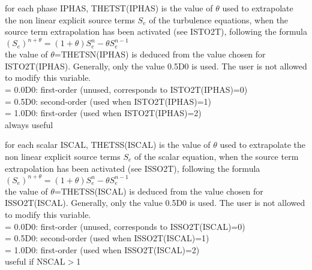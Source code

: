 {for each phase IPHAS, THETST(IPHAS) is the value of $\theta$ used to
extrapolate the non linear explicit source terms $S_e$ of the turbulence equations,
when the source term extrapolation has been activated (see ISTO2T),
following the formula\\
$(S_e)^{n+\theta}=(1+\theta)S_e^n-\theta S_e^{n-1}$\\
the value
of $\theta$=THETSN(IPHAS) is deduced from the value chosen for
ISTO2T(IPHAS). Generally, only the value 0.5D0 is used. The user is not
allowed to modify this variable.\\
\hspace*{1.3cm}= 0.0D0: first-order (unused, corresponds to ISTO2T(IPHAS)=0) \\
\hspace*{1.3cm}= 0.5D0: second-order (used when ISTO2T(IPHAS)=1) \\
\hspace*{1.3cm}= 1.0D0: first-order (used when ISTO2T(IPHAS)=2) \\
always useful}

{for each scalar ISCAL, THETSS(ISCAL) is the value of $\theta$ used to
extrapolate the non linear explicit source terms $S_e$ of the scalar equation,
when the source term extrapolation has been activated (see ISSO2T),
following the formula\\
$(S_e)^{n+\theta}=(1+\theta)S_e^n-\theta S_e^{n-1}$\\
the value
of $\theta$=THETSS(ISCAL) is deduced from the value chosen for
ISSO2T(ISCAL). Generally, only the value 0.5D0 is used. The user is not
allowed to modify this variable.\\
\hspace*{1.3cm}= 0.0D0: first-order (unused, corresponds to ISSO2T(ISCAL)=0) \\
\hspace*{1.3cm}= 0.5D0: second-order (used when ISSO2T(ISCAL)=1) \\
\hspace*{1.3cm}= 1.0D0: first-order (used when ISSO2T(ISCAL)=2) \\
useful if NSCAL$>$1}



